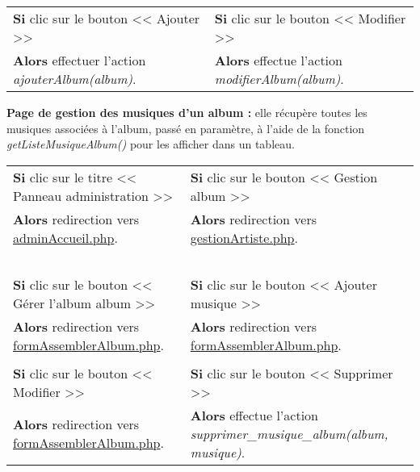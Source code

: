             \begin{center}
                \begin{tabular}{l | l}
                    \textbf{Si} clic sur le bouton << Ajouter >> & \textbf{Si} clic sur le bouton << Modifier >> \\
                    \textbf{Alors} effectuer l'action \emph{ajouterAlbum(album)}. & \textbf{Alors} effectue l'action \emph{modifierAlbum(album)}.
                \end{tabular}
            \end{center}
            
            
        \newpage
            
            \begin{paragraphe}
                \textbf{Page de gestion des musiques d'un album :} elle récupère toutes les musiques associées à l'album, passé en paramètre, à l'aide de la fonction \emph{getListeMusiqueAlbum()} pour les afficher dans un tableau.
            \end{paragraphe}

            \begin{center}
                \begin{tabular}{l | l}
                    \textbf{Si} clic sur le titre << Panneau administration >> & \textbf{Si} clic sur le bouton << Gestion album >> \\
                    \textbf{Alors} redirection vers \underline{adminAccueil.php}. & \textbf{Alors} redirection vers \underline{gestionArtiste.php}. \\ \\

                    \textbf{Si} clic sur le bouton << Gérer l'album album >> & \textbf{Si} clic sur le bouton << Ajouter musique >> \\
                    \textbf{Alors} redirection vers \underline{formAssemblerAlbum.php}. & \textbf{Alors} redirection vers \underline{formAssemblerAlbum.php}. \\ \\
                    
                    \textbf{Si} clic sur le bouton << Modifier >> & \textbf{Si} clic sur le bouton << Supprimer >> \\
                    \textbf{Alors} redirection vers \underline{formAssemblerAlbum.php}. & \textbf{Alors} effectue l'action \emph{supprimer\_musique\_album(album, musique)}.
                \end{tabular}
            \end{center}
            
